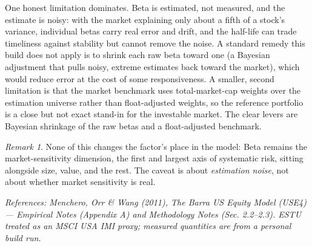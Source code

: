 \documentclass[11pt]{article}
\theoremstyle{definition}
\theoremstyle{plain}
\theoremstyle{remark}
\newtheorem*{remark}{Remark}
\begin{document}
\begin{pitfall}
One honest limitation dominates. Beta is estimated, not measured, and the estimate is noisy: with the market explaining only about a fifth of a stock's variance, individual betas carry real error and drift, and the half-life can trade timeliness against stability but cannot remove the noise. A standard remedy this build does not apply is to shrink each raw beta toward one (a Bayesian adjustment that pulls noisy, extreme estimates back toward the market), which would reduce error at the cost of some responsiveness. A smaller, second limitation is that the market benchmark uses total-market-cap weights over the estimation universe rather than float-adjusted weights, so the reference portfolio is a close but not exact stand-in for the investable market. The clear levers are Bayesian shrinkage of the raw betas and a float-adjusted benchmark.
\end{pitfall}

\begin{remark}
None of this changes the factor's place in the model: Beta remains the market-sensitivity dimension, the first and largest axis of systematic risk, sitting alongside size, value, and the rest. The caveat is about \emph{estimation noise}, not about whether market sensitivity is real.
\end{remark}

\begin{center}\small\itshape
References: Menchero, Orr \& Wang (2011), \textit{The Barra US Equity Model (USE4)} --- Empirical Notes (Appendix A) and Methodology Notes (Sec. 2.2--2.3). ESTU treated as an MSCI USA IMI proxy; measured quantities are from a personal build run.
\end{center}
\end{document}
